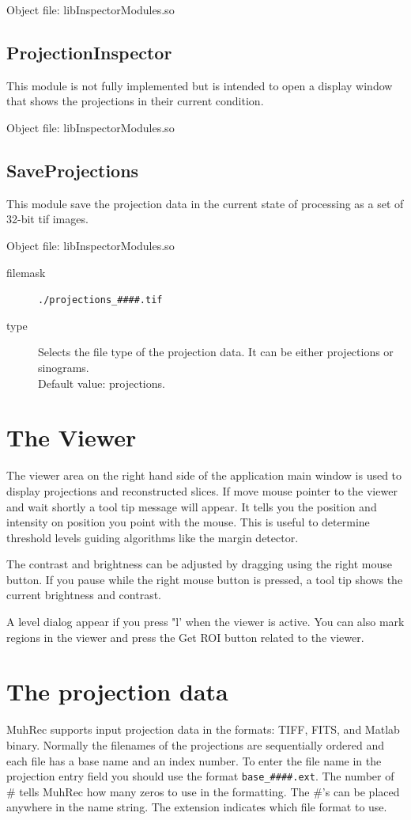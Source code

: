 \documentclass[a4paper]{scrreprt}
\begin{document}
Object file: libInspectorModules.so

\subsection{ProjectionInspector}
This module is not fully implemented but is intended to open a display window
that shows the projections in their current condition.

Object file: libInspectorModules.so

\subsection{SaveProjections}
This module save the projection data in the current state of processing as a
set of 32-bit tif images.

Object file: libInspectorModules.so
\begin{description}
 \item[filemask] \verb+./projections_####.tif+
\item[type] Selects the file type of the projection data. It can be either
projections or sinograms. \\Default value: projections.
\end{description}

\section{The Viewer}
The viewer area on the right hand side of the application main window is used to
display projections and reconstructed slices. If move mouse pointer to the
viewer and wait shortly a tool tip message will appear. It tells you the
position and intensity on position you point with the mouse. This is useful to
determine threshold levels guiding algorithms like the margin detector.

The contrast and brightness can be adjusted by dragging using the right mouse
button. If you pause while the right mouse button is pressed, a tool tip shows
the current brightness and contrast.

A level dialog appear if you press "l' when the viewer is active. You can also mark regions in the viewer and press the Get ROI button related to the viewer. 


\section{The projection data}
MuhRec supports input projection data in the formats: TIFF, FITS, and Matlab
binary. Normally the filenames of the projections are sequentially ordered and
each file has a base name and an index number. To enter the file name in the
projection entry field you should use the format \verb+base_####.ext+. The
number of \# tells MuhRec how many zeros to use in the formatting. The \#'s can
be placed anywhere in the name string. The extension indicates which file format
to use.
\end{document}

